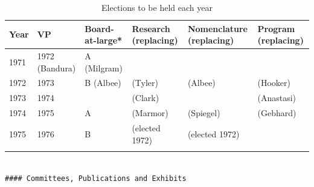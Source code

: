  \begin{longtable}[!t]{ | p{1cm} | p{2cm} | p{1cm} |  p{2cm} | p{2cm} | p{2cm} |}
\hline
Year&
VP&
Board-at-large*&
Research (replacing)&
Nomenclature
(replacing)&
Program
(replacing)\\ \hline
1971&
1972 (Bandura)&
A (Milgram)&
&
&
\\
1972&
1973 &
B (Albee)&
(Tyler)&
(Albee)&
(Hooker)\\
1973&
1974&
&
(Clark)&
&
(Anastasi)\\
1974&
1975&
A&
(Marmor)&
(Spiegel)&
(Gebhard)\\
1975&
1976&
B&
(elected 1972)&

(elected 1972)\\ \hline
\caption{Elections to be held each year}
\label{table: elections}
\end{longtable}

\begin{adjustwidth}{2.5em}{2.5em}
\begin{verbatim}

#### Committees, Publications and Exhibits

\end{verbatim}
\end{adjustwidth}

